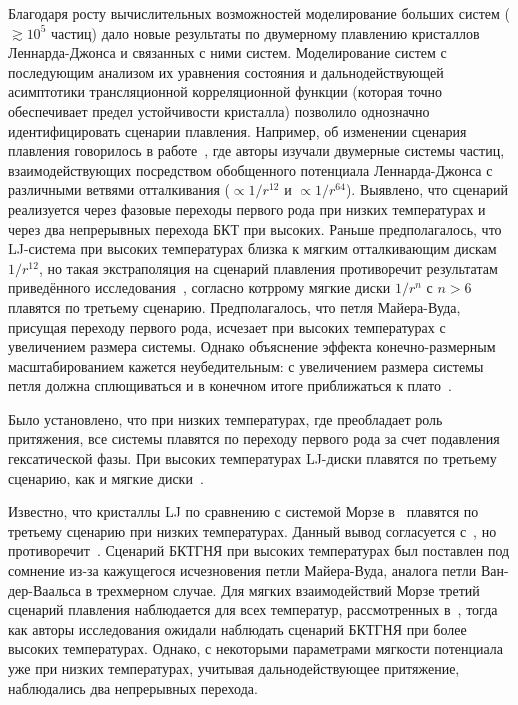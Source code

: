 Благодаря росту вычислительных возможностей моделирование больших систем ($\gtrsim 10^5$ частиц) дало новые результаты по двумерному плавлению кристаллов Леннарда-Джонса и связанных с ними систем.
Моделирование систем с последующим анализом их уравнения состояния и дальнодействующей асимптотики трансляционной корреляционной функции (которая точно обеспечивает предел устойчивости кристалла) позволило однозначно идентифицировать сценарии плавления. 
Например, об изменении сценария плавления говорилось в работе~\cite{10.1103/physreve.99.022145}, где авторы изучали двумерные системы частиц, взаимодействующих посредством обобщенного потенциала Леннарда-Джонса с различными ветвями отталкивания ($\propto 1/r ^{12}$ и $\propto 1/r^{64}$).
Выявлено, что сценарий реализуется через фазовые переходы первого рода при низких температурах и через два непрерывных перехода БКТ при высоких.
Раньше предполагалось, что LJ-система при высоких температурах близка к мягким отталкивающим дискам $1/r^{12}$, но такая экстраполяция на сценарий плавления противоречит результатам приведённого исследования~\cite{10.1103/physrevlett.114.035702}, согласно котррому мягкие диски $1/r^n$ с $n>6$ плавятся по третьему сценарию. 
Предполагалось, что петля Майера-Вуда, присущая переходу первого рода, исчезает при высоких температурах с увеличением размера системы. 
Однако объяснение эффекта конечно-размерным масштабированием кажется неубедительным: с увеличением размера системы петля должна сплющиваться и в конечном итоге приближаться к плато~\cite{10.1103/physreve.87.042134, 10.1103/physreve.59.2659}.

Было установлено, что при низких температурах, где преобладает роль притяжения, все системы плавятся по переходу первого рода за счет подавления гексатической фазы.
При высоких температурах LJ-диски плавятся по третьему сценарию, как и мягкие диски~\cite{10.1103/physrevlett.114.035702}.

Известно, что кристаллы LJ по сравнению с системой Морзе в~\cite{10.1103/physrevb.103.094107} плавятся по третьему сценарию при низких температурах. 
Данный вывод согласуется с~\cite{10.1103/physreve.99.022145}, но противоречит~\cite{10.1103/physrevlett.114.035702}. 
Сценарий БКТГНЯ при высоких температурах был поставлен под сомнение из-за кажущегося исчезновения петли Майера-Вуда, аналога петли Ван-дер-Ваальса в трехмерном случае.
Для мягких взаимодействий Морзе третий сценарий плавления наблюдается для всех температур, рассмотренных в~\cite{10.1103/physrevb.103.094107}, тогда как авторы исследования ожидали наблюдать сценарий БКТГНЯ при более высоких температурах.
Однако, с некоторыми параметрами мягкости потенциала уже при низких температурах, учитывая дальнодействующее притяжение, наблюдались два непрерывных перехода.

